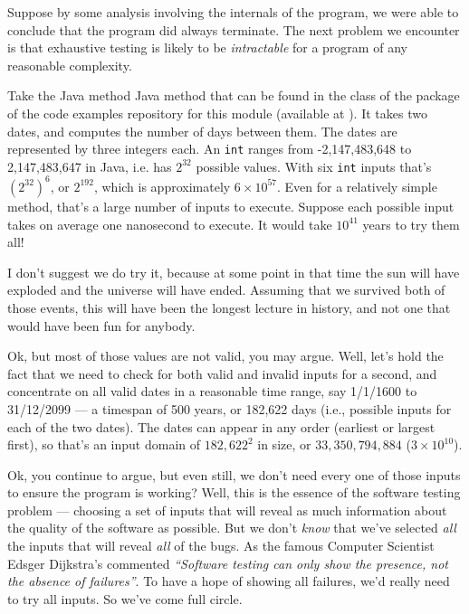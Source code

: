 Suppose by some analysis involving the internals of the program, we were able to
conclude that the program did always terminate. The next problem we encounter is
that exhaustive testing is likely to be {\it intractable} for a program of any
reasonable complexity. 


Take the Java method \daysbetweentwodatesmethod Java method that can be found in
the \calendarclass class of the \lecturespackage package of the code examples
repository for this module (available at \coderepourl). It takes two dates,
and computes the number of days between them. The dates are represented by three
integers each. An {\tt int} ranges from -2,147,483,648 to 2,147,483,647 in Java,
i.e. has $2^{32}$ possible values. With six {\tt int} inputs that's
${(2^{32})}^6$, or $2^{192}$, which is approximately $6 \times {10}^{57}$. Even
for a relatively simple method, that's a large number of inputs to execute.
Suppose each possible input takes on average one nanosecond to execute. It would
take ${10}^{41}$ years to try them all!

I don't suggest we do try it, because at some point in that time the sun will
have exploded and the universe will have ended. Assuming that we survived both
of those events, this will have been the longest lecture in history, and not one
that would have been fun for anybody.

Ok, but most of those values are not valid, you may argue. Well, let's hold the
fact that we need to check for both valid and invalid inputs for a second, and
concentrate on all valid dates in a reasonable time range, say 1/1/1600 to
31/12/2099 --- a timespan of 500 years, or 182,622 days (i.e., possible inputs
for each of the two dates). The dates can appear in any order (earliest or
largest first), so that's an input domain of ${182,622}^2$ in size, or
$33,350,794,884$ ($3 \times {10}^{10}$).



Ok, you continue to argue, but even still, we don't need every one of those
inputs to ensure the program is working? Well, this is the essence of the
software testing problem --- choosing a set of inputs that will reveal as much
information about the quality of the software as possible. But we don't {\it
know} that we've selected {\it all} the inputs that will reveal {\it all} of the
bugs. As the famous Computer Scientist Edsger Dijkstra's commented {\it
``Software testing can only show the presence, not the absence of failures''}.
To have a hope of showing all failures, we'd really need to try all inputs. So
we've come full circle. 

